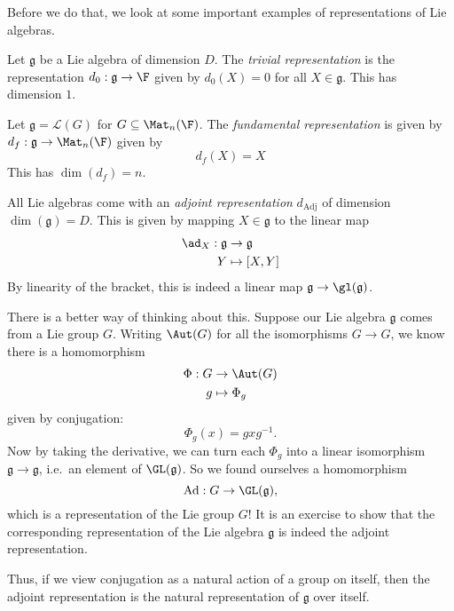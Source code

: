\documentclass[a4paper]{article}
\begin{document}
Before we do that, we look at some important examples of representations of Lie algebras.
\begin{defi}
  Let $\mathfrak{g}$ be a Lie algebra of dimension $D$. The \emph{trivial representation} is the representation $d_0: \mathfrak{g} \to \F$ given by $d_0(X) = 0$ for all $X \in \mathfrak{g}$. This has dimension $1$.
\end{defi}

\begin{defi}
  Let $\mathfrak{g} = \mathcal{L}(G)$ for $G \subseteq \Mat_n(\F)$. The \emph{fundamental representation} is given by $d_f: \mathfrak{g} \to \Mat_n(\F)$ given by
  \[
    d_f (X) = X
  \]
  This has $\dim (d_f) = n$.
\end{defi}

\begin{defi}
  All Lie algebras come with an \emph{adjoint representation} $d_\mathrm{Adj}$ of dimension $\dim(\mathfrak{g}) = D$. This is given by mapping $X \in \mathfrak{g}$ to the linear map
  \begin{align*}
    \ad_X: \mathfrak{g} &\to \mathfrak{g}\\
    Y &\mapsto [X, Y]
  \end{align*}
  By linearity of the bracket, this is indeed a linear map $\mathfrak{g} \to \gl(\mathfrak{g})$.
\end{defi}
There is a better way of thinking about this. Suppose our Lie algebra $\mathfrak{g}$ comes from a Lie group $G$. Writing $\Aut(G)$ for all the isomorphisms $G \to G$, we know there is a homomorphism
\begin{align*}
  \Phi: G &\to \Aut(G)\\
  g &\mapsto \Phi_g
\end{align*}
given by conjugation:
\[
  \Phi_g(x) = gxg^{-1}.
\]
Now by taking the derivative, we can turn each $\Phi_g$ into a linear isomorphism $\mathfrak{g} \to \mathfrak{g}$, i.e.\ an element of $\GL(\mathfrak{g})$. So we found ourselves a homomorphism
\[
  \mathrm{Ad}: G \to \GL(\mathfrak{g}),
\]
which is a representation of the Lie group $G$! It is an exercise to show that the corresponding representation of the Lie algebra $\mathfrak{g}$ is indeed the adjoint representation.

Thus, if we view conjugation as a natural action of a group on itself, then the adjoint representation is the natural representation of $\mathfrak{g}$ over itself.
\end{document}
